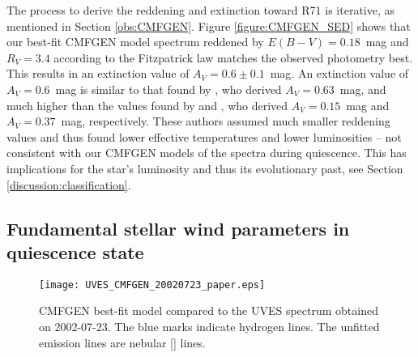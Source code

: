 \documentclass[structabstract]{aa}
\begin{document}
The process to derive the reddening and extinction toward R71 is iterative, as mentioned in Section \ref{obs:CMFGEN}. 
Figure \ref{figure:CMFGEN_SED} shows that our best-fit CMFGEN model spectrum reddened by $E(B-V)=0.18$~mag  and $R_V = 3.4$ according to the Fitzpatrick law  \citep{1999PASP..111...63F} matches the observed photometry best. This results in an extinction value of $A_V = 0.6 \pm 0.1$~mag.
An extinction value of $A_V = 0.6$~mag is similar to that found by \citet{1993SSRv...66..207L}, who derived $A_V = 0.63$~mag, and much higher than the values found by \citet{1981A&A...103...94W}  and \citet{1988A&AS...74..453V}, who derived $A_V = 0.15$~mag and $A_V = 0.37$~mag, respectively. These authors assumed much smaller reddening values and thus found lower effective temperatures and lower luminosities -- not consistent with our CMFGEN models of the spectra during quiescence. This has implications for the star's luminosity and thus its evolutionary past, see Section \ref{discussion:classification}. 



\subsection{Fundamental stellar wind parameters in quiescence state}
\label{results:physicalparameters_quiescence}

\begin{figure*}
\centering
\texttt{[image: UVES\_CMFGEN\_20020723\_paper.eps]}
     \caption{CMFGEN  best-fit model compared to the UVES spectrum obtained on 2002-07-23. The blue marks indicate hydrogen lines. The unfitted emission lines are nebular [] lines.}\label{figure:CMFGEN_UVES}
\end{figure*}
\end{document}
